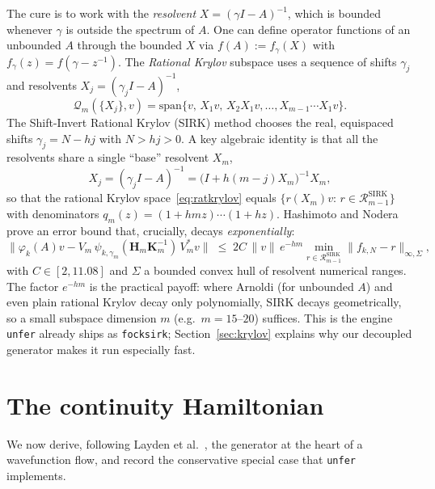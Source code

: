 \documentclass[11pt, a4paper]{article}
\begin{document}
The cure is to work with the \emph{resolvent} $X=(\gamma I-A)^{-1}$, which is
bounded whenever $\gamma$ is outside the spectrum of $A$. One can define
operator functions of an unbounded $A$ through the bounded $X$ via
$f(A):=f_\gamma(X)$ with $f_\gamma(z)=f(\gamma-z^{-1})$. The
\emph{Rational Krylov} subspace uses a sequence of shifts $\gamma_j$ and
resolvents $X_j=(\gamma_j I-A)^{-1}$,
\begin{equation}
  \mathcal{Q}_m(\{X_j\},v)
  =\mathrm{span}\{v,\,X_1v,\,X_2X_1v,\dots,X_{m-1}\cdots X_1 v\}.
  \label{eq:ratkrylov}
\end{equation}
The Shift-Invert Rational Krylov (SIRK) method chooses the real, equispaced
shifts $\gamma_j=N-hj$ with $N>hj>0$. A key algebraic identity is that
all the resolvents share a single ``base'' resolvent $X_m$,
\begin{equation}
  X_j=(\gamma_j I-A)^{-1}=\bigl(I+h(m-j)X_m\bigr)^{-1}X_m,
\end{equation}
so that the rational Krylov space~\eqref{eq:ratkrylov} equals
$\{r(X_m)v:\,r\in\mathcal{R}^{\mathrm{SIRK}}_{m-1}\}$ with denominators
$q_m(z)=(1+hmz)\cdots(1+hz)$. Hashimoto and Nodera prove an error bound that,
crucially, decays \emph{exponentially}:
\begin{equation}
  \bigl\|\varphi_k(A)v-V_m\,\psi_{k,\gamma_m}(\mathbf{H}_m\mathbf{K}_m^{-1})\,V_m^*v\bigr\|
  \;\le\;2C\,\|v\|\,e^{-hm}\!\!\min_{r\in\mathcal{R}^{\mathrm{SIRK}}_{m-1}}\!
  \|f_{k,N}-r\|_{\infty,\Sigma},
  \label{eq:sirkbound}
\end{equation}
with $C\in[2,11.08]$ and $\Sigma$ a bounded convex hull of resolvent numerical
ranges. The factor $e^{-hm}$ is the practical payoff: where Arnoldi (for
unbounded $A$) and even plain rational Krylov decay only polynomially, SIRK
decays geometrically, so a small subspace dimension $m$ (e.g.\ $m=15$--$20$)
suffices. This is the engine \texttt{unfer} already ships as
\texttt{fock\textunderscore sirk}; Section~\ref{sec:krylov} explains why our
decoupled generator makes it run especially fast.

\section{The continuity Hamiltonian}
\label{sec:continuity}

We now derive, following Layden et al.~\cite{Layden2025}, the generator at the
heart of a wavefunction flow, and record the conservative special case that
\texttt{unfer} implements.
\end{document}
